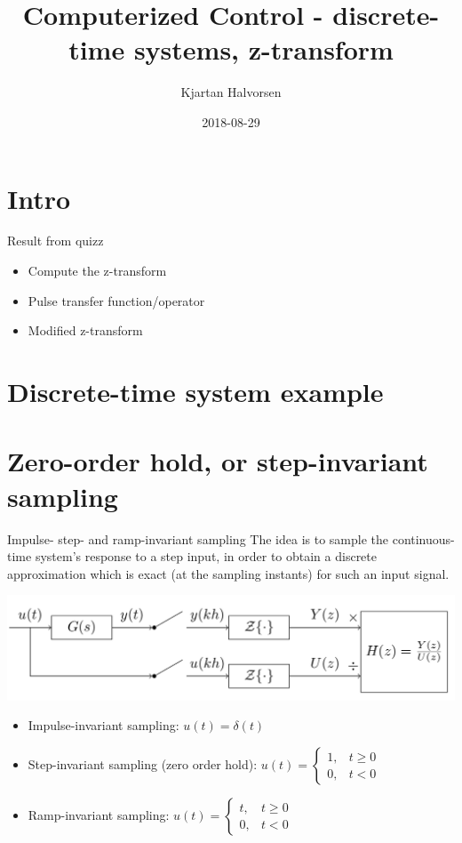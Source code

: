\documentclass[presentation,aspectratio=169]{beamer}
\author{Kjartan Halvorsen}
\date{2018-08-29}
\title{Computerized Control - discrete-time systems, z-transform}
\begin{document}
\maketitle


\section{Intro}
\label{sec-1}


\begin{frame}[label=sec-1-1]{Result from quizz}
\begin{itemize}
\item Compute the z-transform
\item Pulse transfer function/operator
\item Modified z-transform
\end{itemize}
\end{frame}

\section{Discrete-time system example}
\label{sec-2}

\section{Zero-order hold, or step-invariant sampling}
\label{sec-3}
\begin{frame}[label=sec-3-1]{Impulse- step- and ramp-invariant sampling}
The idea is to sample the continuous-time system's response to a step input, in order to obtain a discrete approximation which is \alert{exact} (at the sampling instants) for such an input signal. 

\begin{center}
\includegraphics[width=0.7\linewidth]{../../figures/invariant-sampling.png}
\end{center}

\begin{itemize}
\item Impulse-invariant sampling: \( u(t) = \delta(t)\)
\item Step-invariant sampling (zero order hold): \( u(t) = \begin{cases} 1, & t \ge 0\\0, & t<0 \end{cases} \)
\item Ramp-invariant sampling: \( u(t) = \begin{cases} t, & t \ge 0\\0, & t<0 \end{cases} \)
\end{itemize}
\end{frame}
\end{document}
